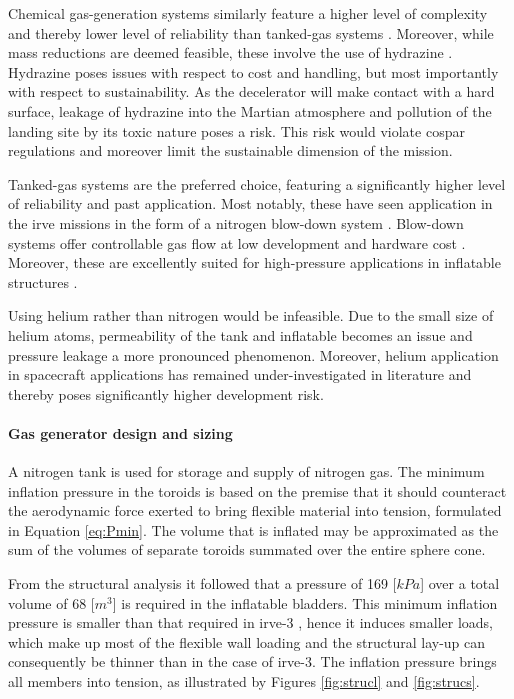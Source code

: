 Chemical gas-generation systems similarly feature a higher level of complexity and thereby lower level of reliability than tanked-gas systems \cite{Jenkins2001}. Moreover, while mass reductions are deemed feasible, these involve the use of hydrazine \cite{Jenkins2001, Freeland1998}. Hydrazine poses issues with respect to cost and handling, but most importantly with respect to sustainability. As the decelerator will make contact with a hard surface, leakage of hydrazine into the Martian atmosphere and pollution of the landing site by its toxic nature poses a risk. This risk would violate \gls{cospar} regulations and moreover limit the sustainable dimension of the mission.

Tanked-gas systems are the preferred choice, featuring a significantly higher level of reliability and past application. Most notably, these have seen application in the \gls{irve} missions in the form of a nitrogen blow-down system \cite{Smith2010}. Blow-down systems offer controllable gas flow at low development and hardware cost \cite{Freeland1998}. Moreover, these are excellently suited for high-pressure applications in inflatable structures \cite{Jenkins2001}.

Using helium rather than nitrogen would be infeasible. Due to the small size of helium atoms, permeability of the tank and inflatable becomes an issue and pressure leakage a more pronounced phenomenon. Moreover, helium application in spacecraft applications has remained under-investigated in literature and thereby poses significantly higher development risk.


\paragraph{Gas generator design and sizing}
A nitrogen tank is used for storage and supply of nitrogen gas. The minimum inflation pressure in the toroids is based on the premise that it should counteract the aerodynamic force exerted to bring flexible material into tension, formulated in Equation \ref{eq:Pmin}. The volume that is inflated may be approximated as the sum of the volumes of separate toroids summated over the entire sphere cone.

From the structural analysis it followed that a pressure of 169 [$kPa$] over a total volume of 68 [$m^{3}$] is required in the inflatable bladders. This minimum inflation pressure is smaller than that required in \gls{irve}-3 \cite{Jurewicz2011}, hence it induces smaller loads, which make up most of the flexible wall loading and the structural lay-up can consequently be thinner than in the case of \gls{irve}-3. The inflation pressure brings all members into tension, as illustrated by Figures \ref{fig:strucl} and \ref{fig:strucs}.

